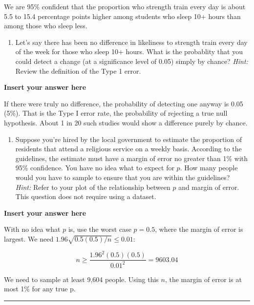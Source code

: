 \documentclass[
]{article}
\providecommand{\tightlist}{%
  \setlength{\itemsep}{0pt}\setlength{\parskip}{0pt}}
\begin{document}
We are 95\% confident that the proportion who strength train every day
is about 5.5 to 15.4 percentage points higher among students who sleep
10+ hours than among those who sleep less.

\begin{enumerate}
\def\labelenumi{\arabic{enumi}.}
\setcounter{enumi}{9}
\tightlist
\item
  Let's say there has been no difference in likeliness to strength train
  every day of the week for those who sleep 10+ hours. What is the
  probablity that you could detect a change (at a significance level of
  0.05) simply by chance? \emph{Hint:} Review the definition of the Type
  1 error.
\end{enumerate}

\textbf{Insert your answer here}

If there were truly no difference, the probability of detecting one
anyway is 0.05 (5\%). That is the Type I error rate, the probability of
rejecting a true null hypothesis. About 1 in 20 such studies would show
a difference purely by chance.

\begin{enumerate}
\def\labelenumi{\arabic{enumi}.}
\setcounter{enumi}{10}
\tightlist
\item
  Suppose you're hired by the local government to estimate the
  proportion of residents that attend a religious service on a weekly
  basis. According to the guidelines, the estimate must have a margin of
  error no greater than 1\% with 95\% confidence. You have no idea what
  to expect for \(p\). How many people would you have to sample to
  ensure that you are within the guidelines?\\
  \emph{Hint:} Refer to your plot of the relationship between \(p\) and
  margin of error. This question does not require using a dataset.
\end{enumerate}

\textbf{Insert your answer here}

With no idea what \(p\) is, use the worst case \(p = 0.5\), where the
margin of error is largest. We need \(1.96\sqrt{0.5(0.5)/n} \leq 0.01\):

\[n \geq \frac{1.96^2 (0.5)(0.5)}{0.01^2} = 9603.04\]

We need to sample at least 9,604 people. Using this \(n\), the margin of
error is at most 1\% for any true p.

\begin{center}\rule{0.5\linewidth}{0.5pt}\end{center}
\end{document}
